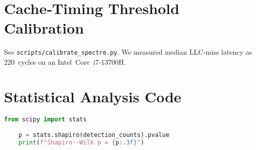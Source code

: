 \documentclass[11pt,letterpaper]{article}
\begin{document}
    \appendix

    \section{Cache‑Timing Threshold Calibration}
    \label{app:threshold}
    See \texttt{scripts/calibrate\_spectre.py}. We measured median LLC‑miss latency as \SI{220}{cycles} on an Intel Core i7‑13700H.

    \section{Statistical Analysis Code}
    \label{app:stats}
    \begin{lstlisting}[caption={Python snippet for Shapiro--Wilk test},label={lst:stats},language=Python]
    from scipy import stats

    p = stats.shapiro(detection_counts).pvalue
    print(f"Shapiro--Wilk p = {p:.3f}")
    \end{lstlisting}
\end{document}
